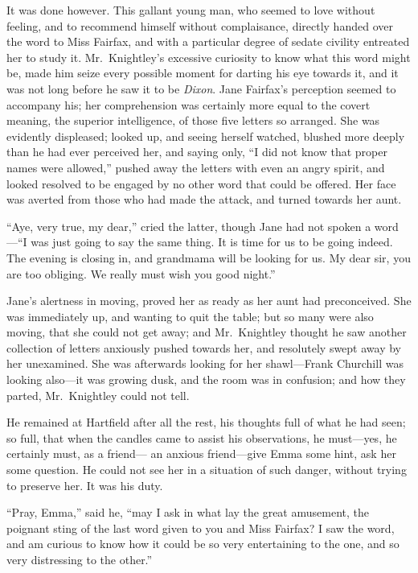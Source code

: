 It was done however.  This gallant young man, who seemed to love
without feeling, and to recommend himself without complaisance,
directly handed over the word to Miss Fairfax, and with a particular
degree of sedate civility entreated her to study it.  Mr.\ Knightley's
excessive curiosity to know what this word might be, made him seize
every possible moment for darting his eye towards it, and it was
not long before he saw it to be \emph{Dixon}.  Jane Fairfax's perception
seemed to accompany his; her comprehension was certainly more equal
to the covert meaning, the superior intelligence, of those five letters
so arranged.  She was evidently displeased; looked up, and seeing
herself watched, blushed more deeply than he had ever perceived her,
and saying only, ``I did not know that proper names were allowed,''
pushed away the letters with even an angry spirit, and looked
resolved to be engaged by no other word that could be offered.
Her face was averted from those who had made the attack, and turned
towards her aunt.

``Aye, very true, my dear,'' cried the latter, though Jane had not
spoken a word---``I was just going to say the same thing.  It is time
for us to be going indeed.  The evening is closing in, and grandmama
will be looking for us.  My dear sir, you are too obliging.
We really must wish you good night.''

Jane's alertness in moving, proved her as ready as her aunt
had preconceived.  She was immediately up, and wanting to quit
the table; but so many were also moving, that she could not get away;
and Mr.\ Knightley thought he saw another collection of letters anxiously
pushed towards her, and resolutely swept away by her unexamined.
She was afterwards looking for her shawl---Frank Churchill was
looking also---it was growing dusk, and the room was in confusion;
and how they parted, Mr.\ Knightley could not tell.

He remained at Hartfield after all the rest, his thoughts full
of what he had seen; so full, that when the candles came to assist
his observations, he must---yes, he certainly must, as a friend---%
an anxious friend---give Emma some hint, ask her some question.
He could not see her in a situation of such danger, without trying to
preserve her.  It was his duty.

``Pray, Emma,'' said he, ``may I ask in what lay the great amusement,
the poignant sting of the last word given to you and Miss Fairfax?
I saw the word, and am curious to know how it could be so very
entertaining to the one, and so very distressing to the other.''

